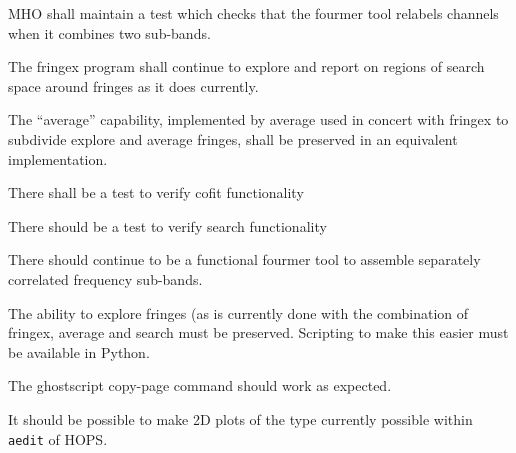 \begin{description}
 \acs{MHO} shall maintain a test which checks that the \acs{fourmer}
tool relabels channels when it combines two sub-bands.

 The \acs{fringex} program shall continue to explore and report
      on regions of search space around fringes as it does currently.

 The ``average'' capability, implemented by \acs{average}
      used in concert with \acs{fringex} to subdivide explore and average
      fringes, shall be preserved in an equivalent implementation.

 There shall be a test to verify \acs{cofit} functionality

 There should be a test to verify \acs{search} functionality

 There should continue to be a functional \acs{fourmer} tool
      to assemble separately correlated frequency sub-bands.

 The ability to explore fringes (as is currently done with
    the combination of \acs{fringex}, \acs{average} and search must be
    preserved.  Scripting to make this easier must be available in
    \acs{Python}.

 The ghostscript copy-page command should work as expected.

 It should be possible to make 2D plots of the type
    currently possible within \texttt{\acs{aedit}} of \acs{HOPS}.


\end{description}
